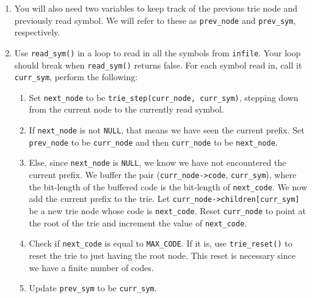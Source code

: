 \documentclass{article}
\begin{document}
\begin{enumerate}
    \item You will also need two variables to keep track of the previous trie
        node and previously read symbol. We will refer to these as
        \texttt{prev\_node} and \texttt{prev\_sym}, respectively.

    \item Use \texttt{read\_sym()} in a loop to read in all the symbols from
        \texttt{infile}. Your loop should break when \texttt{read\_sym()}
        returns false. For each symbol read in, call it \texttt{curr\_sym},
        perform the following:

        \begin{enumerate}
            \item Set \texttt{next\_node} to be \texttt{trie\_step(curr\_node,
                curr\_sym)}, stepping down from the current node to the
                currently read symbol.

            \item If \texttt{next\_node} is not \texttt{NULL}, that means we
                have seen the current prefix. Set \texttt{prev\_node} to be
                \texttt{curr\_node} and then \texttt{curr\_node} to be
                \texttt{next\_node}.

            \item Else, since \texttt{next\_node} is \texttt{NULL}, we know we
                have not encountered the current prefix. We buffer the pair
                (\texttt{curr\_node->code}, \texttt{curr\_sym}), where the
                bit-length of the buffered code is the bit-length of
                \texttt{next\_code}. We now add the current prefix to the trie.
                Let \texttt{curr\_node->children[curr\_sym]} be a new trie node
                whose code is \texttt{next\_code}. Reset \texttt{curr\_node} to
                point at the root of the trie and increment the value of
                \texttt{next\_code}.

            \item Check if \texttt{next\_code} is equal to \texttt{MAX\_CODE}.
                If it is, use \texttt{trie\_reset()} to reset the trie to just
                having the root node. This reset is necessary since we have a
                finite number of codes.

            \item Update \texttt{prev\_sym} to be \texttt{curr\_sym}.
        \end{enumerate}


\end{enumerate}
\end{document}
